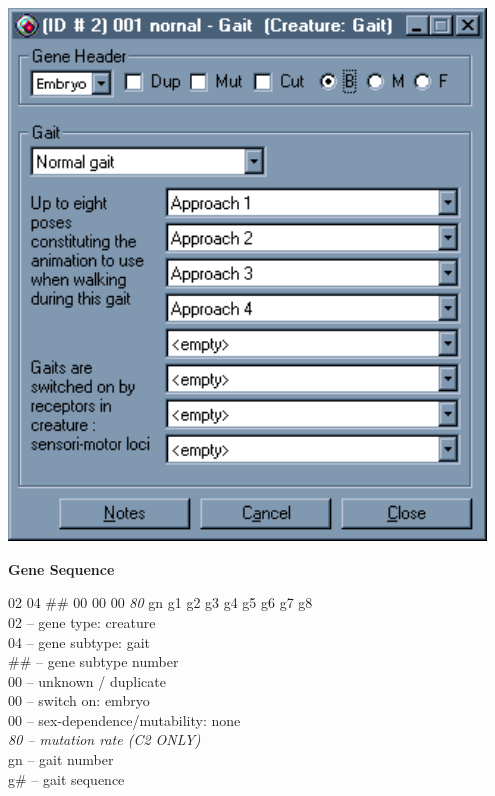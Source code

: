 \documentclass[11pt,twoside,a4paper]{article}
\begin{document}
\begin{minipage}[ht]{0.40\textwidth}
	\includegraphics[width=0.95\textwidth]{img/gen24k.png}
\end{minipage} \hfill \begin{minipage}[ht]{0.575\textwidth}
	\textbf{\large Gene Sequence} %

	02 04 \#\# 00 00 00 \emph{80} gn g1 g2 g3 g4 g5 g6 g7 g8 ~\\

	02 -- gene type: creature ~\\
	04 -- gene subtype: gait ~\\
	\#\# -- gene subtype number ~\\
	00 -- unknown / duplicate ~\\
	00 -- switch on: embryo ~\\
	00 -- sex-dependence/mutability: none ~\\
	\emph{80 -- mutation rate (C2 ONLY)} ~\\
	gn -- gait number ~\\
	g\# -- gait sequence ~\\  
\end{minipage} ~\\
\end{document}
